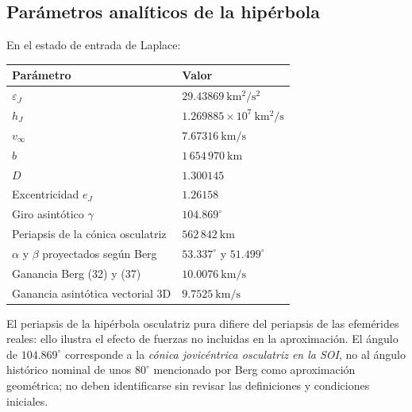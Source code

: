 \documentclass[11pt,a4paper]{article}
\begin{document}
\subsection{Parámetros analíticos de la hipérbola}
En el estado de entrada de Laplace:
\begin{center}\begin{tabular}{ll}\toprule
Parámetro & Valor\\\midrule
$\varepsilon_J$ & $29.43869\ \mathrm{km^2/s^2}$\\
$h_J$ & $1.269885\times10^7\ \mathrm{km^2/s}$\\
$v_\infty$ & $7.67316\ \mathrm{km/s}$\\
$b$ & $1\,654\,970\ \mathrm{km}$\\
$D$ & $1.300145$\\
Excentricidad $e_J$ & $1.26158$\\
Giro asintótico $\gamma$ & $104.869^\circ$\\
Periapsis de la cónica osculatriz & $562\,842\ \mathrm{km}$\\
$\alpha$ y $\beta$ proyectados según Berg & $53.337^\circ$ y $51.499^\circ$\\
Ganancia Berg (32) y (37) & $10.0076\ \mathrm{km/s}$\\
Ganancia asintótica vectorial 3D & $9.7525\ \mathrm{km/s}$\\\bottomrule\end{tabular}\end{center}
El periapsis de la hipérbola osculatriz pura difiere del periapsis de las efemérides reales: ello ilustra el efecto de fuerzas no incluidas en la aproximación. El ángulo de $104.869^\circ$ corresponde a la \emph{cónica jovicéntrica osculatriz en la SOI}, no al ángulo histórico nominal de unos $80^\circ$ mencionado por Berg como aproximación geométrica; no deben identificarse sin revisar las definiciones y condiciones iniciales.
\end{document}

